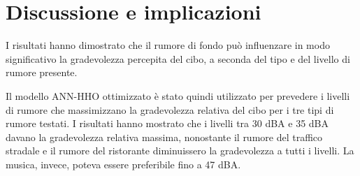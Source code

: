 \newpage
\section{Discussione e implicazioni}
\noindent

I risultati hanno dimostrato che il rumore di fondo può influenzare in modo significativo la gradevolezza percepita del cibo, a seconda del tipo e del livello di rumore presente.

Il modello ANN-HHO ottimizzato è stato quindi utilizzato per prevedere i livelli di rumore che massimizzano la gradevolezza relativa del cibo per i tre tipi di rumore testati. I risultati hanno mostrato che i livelli tra 30 dBA e 35 dBA davano la gradevolezza relativa massima, nonostante il rumore del traffico stradale e il rumore del ristorante diminuissero la gradevolezza a tutti i livelli. La musica, invece, poteva essere preferibile fino a 47 dBA.

